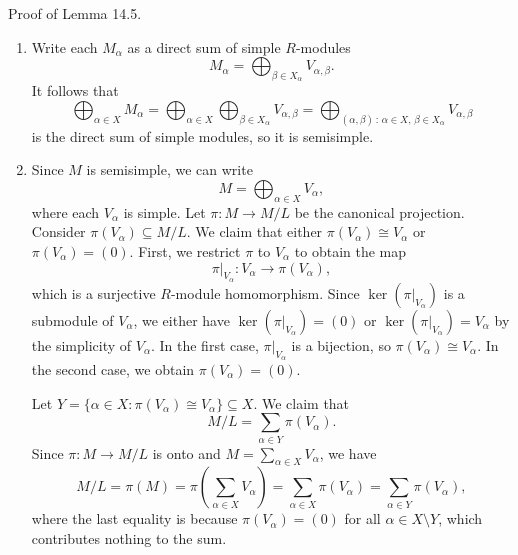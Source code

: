 {\sc Proof of Lemma 14.5.}~
\begin{enumerate}[(1)]
    \item Write each $M_\alpha$ as a direct sum of simple $R$-modules 
    \[ M_\alpha = \bigoplus_{\beta \in X_\alpha} V_{\alpha, \beta}. \] 
    It follows that 
    \[ \bigoplus_{\alpha \in X} M_\alpha 
    = \bigoplus_{\alpha \in X} \bigoplus_{\beta \in X_\alpha} V_{\alpha, \beta}
    = \bigoplus_{(\alpha, \beta)\,:\,\alpha\in X,\,\beta \in X_\alpha} 
    V_{\alpha, \beta} \] 
    is the direct sum of simple modules, so it is semisimple. 
    
    \item Since $M$ is semisimple, we can write 
    \[ M = \bigoplus_{\alpha \in X} V_\alpha, \] 
    where each $V_\alpha$ is simple. Let $\pi : M \to M/L$ be the canonical 
    projection. Consider $\pi(V_\alpha) \subseteq M/L$. We claim that 
    either $\pi(V_\alpha) \cong V_\alpha$ or $\pi(V_\alpha) = (0)$. 
    First, we restrict $\pi$ to $V_\alpha$ to obtain the map 
    \[ \pi|_{V_\alpha} : V_\alpha \to \pi(V_\alpha), \] 
    which is a surjective $R$-module homomorphism. Since $\ker(\pi|_{V_\alpha})$ 
    is a submodule of $V_\alpha$, we either have $\ker(\pi|_{V_\alpha}) = (0)$ 
    or $\ker(\pi|_{V_\alpha}) = V_\alpha$ by the simplicity of $V_\alpha$. 
    In the first case, $\pi|_{V_\alpha}$ is a bijection, so $\pi(V_\alpha) 
    \cong V_\alpha$. In the second case, we obtain $\pi(V_\alpha) = (0)$. 

    Let $Y = \{\alpha \in X : \pi(V_\alpha) \cong V_\alpha\} \subseteq X$. 
    We claim that 
    \[ M/L = \sum_{\alpha \in Y} \pi(V_\alpha). \] 
    Since $\pi : M \to M/L$ is onto and $M = \sum_{\alpha \in X} V_\alpha$, we have 
    \[ M/L = \pi(M) = \pi\left( \sum_{\alpha \in X} V_\alpha \right) 
    = \sum_{\alpha \in X} \pi(V_\alpha) = \sum_{\alpha \in Y} \pi(V_\alpha), \] 
    where the last equality is because $\pi(V_\alpha) = (0)$ for all 
    $\alpha \in X \setminus Y$, which contributes nothing to the sum. 


\end{enumerate}
